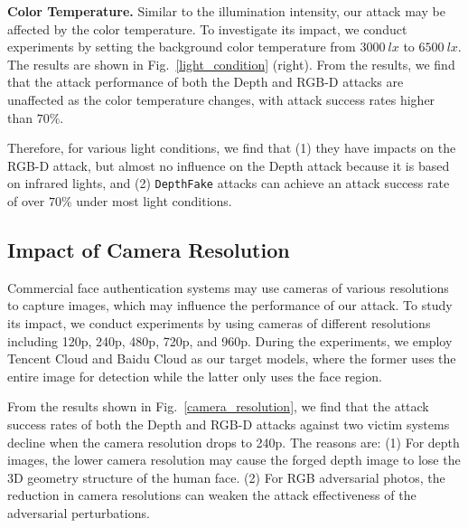 \textbf{Color Temperature.} Similar to the illumination intensity, our attack may be affected by the color temperature. To investigate its impact, we conduct experiments by setting the background color temperature from $3000~lx$ to $6500~lx$.
The results are shown in Fig.~\ref{light_condition} (right). From the results, we find that the attack performance of both the Depth and RGB-D  attacks are unaffected as the color temperature changes, with attack success rates higher than $70\%$.

Therefore, for various light conditions, we find that (1) they have impacts on the RGB-D attack, but almost no influence on the Depth attack because it is based on infrared lights, and (2) \texttt{DepthFake} attacks can achieve an attack success rate of over $70\%$ under most light conditions.

\subsection{Impact of Camera Resolution} 
Commercial face authentication systems may use cameras of various resolutions to capture images, which may influence the performance of our attack. To study its impact, we conduct experiments by using cameras of different resolutions including 120p, 240p, 480p, 720p, and 960p. During the experiments, we employ Tencent Cloud and Baidu Cloud as our target models, where the former uses the entire image for detection while the latter only uses the face region. 

From the results shown in Fig.~\ref{camera_resolution},  we find that the attack success rates of both the Depth and RGB-D attacks against two victim systems decline  when the camera resolution drops to 240p. The reasons are: 
(1) For depth images, the lower camera resolution may cause the forged depth image to lose the 3D geometry structure of the human face.
(2) For RGB adversarial photos, the reduction in camera resolutions can weaken the attack effectiveness of the adversarial perturbations. 

